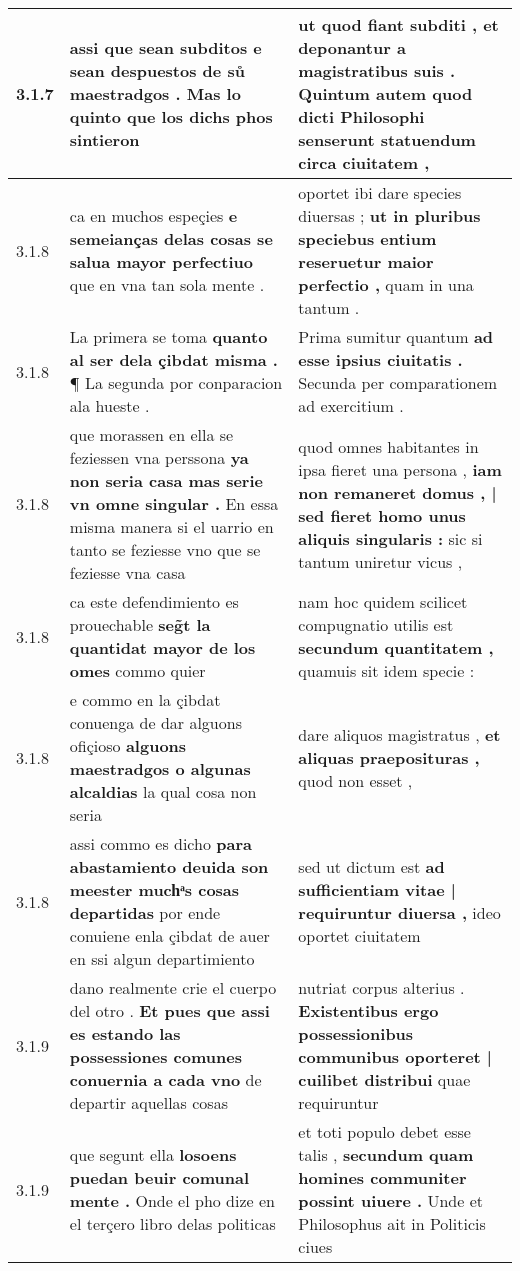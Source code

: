 \begin{tabular}{|p{1cm}|p{6.5cm}|p{6.5cm}|}
3.1.7 & assi que sean subditos \textbf{ e sean despuestos de sů maestradgos . } Mas lo quinto que los dichs phos sintieron & ut quod fiant subditi , \textbf{ et deponantur a magistratibus suis . } Quintum autem quod dicti Philosophi senserunt statuendum circa ciuitatem , \\\hline
3.1.8 & ca en muchos espeçies \textbf{ e semeianças delas cosas se salua mayor perfectiuo } que en vna tan sola mente . & oportet ibi dare species diuersas ; \textbf{ ut in pluribus speciebus entium reseruetur maior perfectio , } quam in una tantum . \\\hline
3.1.8 & La primera se toma \textbf{ quanto al ser dela çibdat misma . } ¶ La segunda por conparacion ala hueste . & Prima sumitur quantum \textbf{ ad esse ipsius ciuitatis . } Secunda per comparationem ad exercitium . \\\hline
3.1.8 & que morassen en ella se feziessen vna perssona \textbf{ ya non seria casa mas serie vn omne singular . } En essa misma manera si el uarrio en tanto se feziesse vno que se feziesse vna casa & quod omnes habitantes in ipsa fieret una persona , \textbf{ iam non remaneret domus , | sed fieret homo unus aliquis singularis : } sic si tantum uniretur vicus , \\\hline
3.1.8 & ca este defendimiento es prouechable \textbf{ seg̃t la quantidat mayor de los omes } commo quier & nam hoc quidem scilicet compugnatio utilis est \textbf{ secundum quantitatem , } quamuis sit idem specie : \\\hline
3.1.8 & e commo en la çibdat conuenga de dar alguons ofiçioso \textbf{ alguons maestradgos o algunas alcaldias } la qual cosa non seria & dare aliquos magistratus , \textbf{ et aliquas praeposituras , } quod non esset , \\\hline
3.1.8 & assi commo es dicho \textbf{ para abastamiento deuida son meester muchͣs cosas departidas } por ende conuiene enla çibdat de auer en ssi algun departimiento & sed ut dictum est \textbf{ ad sufficientiam vitae | requiruntur diuersa , } ideo oportet ciuitatem \\\hline
3.1.9 & dano realmente crie el cuerpo del otro . \textbf{ Et pues que assi es estando las possessiones comunes conuernia a cada vno } de departir aquellas cosas & nutriat corpus alterius . \textbf{ Existentibus ergo possessionibus communibus oporteret | cuilibet distribui } quae requiruntur \\\hline
3.1.9 & que segunt ella \textbf{ losoens puedan beuir comunal mente . } Onde el pho dize en el terçero libro delas politicas & et toti populo debet esse talis , \textbf{ secundum quam homines communiter possint uiuere . } Unde et Philosophus ait in Politicis ciues \\\hline

\end{tabular}
